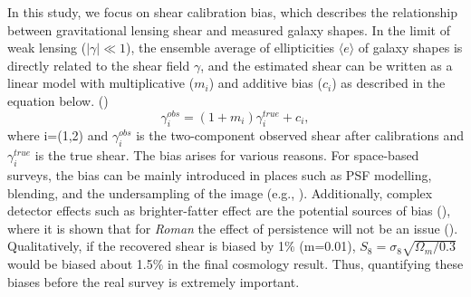 \documentclass[fleqn,usenatbib]{mnras}
\begin{document}
In this study, we focus on shear calibration bias, which describes the relationship between gravitational lensing shear and measured galaxy shapes. In the limit of weak lensing ($\lvert\gamma\rvert\ll1$), the ensemble average of ellipticities $\langle e \rangle$ of galaxy shapes is directly related to the shear field $\gamma$, and the estimated shear can be written as a linear model with multiplicative ($m_{i}$) and additive bias ($c_{i}$) as described in the equation below. (\citealt{2006MNRAS.368.1323H, 2006MNRAS.366..101H, 2007MNRAS.376...13M}) 
\begin{equation}
    \gamma^{obs}_{i} = (1+m_{i})\gamma^{true}_{i} + c_{i}, 
    \label{eqn:linear}
\end{equation}
where i=(1,2) and $\gamma^{obs}_{i}$ is the two-component observed shear after calibrations and $\gamma^{true}_{i}$ is the true shear. The bias arises for various reasons. For space-based surveys, the bias can be mainly introduced in places such as PSF modelling, blending, and the undersampling of the image (e.g., \citealt{2018ARA&A..56..393M}). Additionally, complex detector effects such as brighter-fatter effect are the potential sources of bias (\citealt{2013MNRAS.429..661M}), where it is shown that for \emph{Roman} the effect of persistence will not be an issue (\citealt{2021arXiv210610273L}). Qualitatively, if the recovered shear is biased by 1$\%$ (m=0.01), $S_{8} = \sigma_{8} \sqrt{\Omega_{m}/0.3}$ would be biased about 1.5$\%$ in the final cosmology result. Thus, quantifying these biases before the real survey is extremely important. \par
\end{document}

